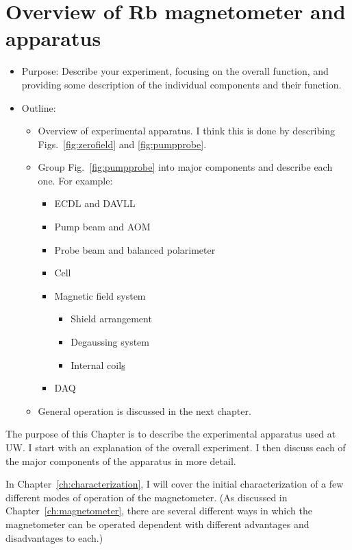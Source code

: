 \chapter{Overview of Rb magnetometer and apparatus}

\begin{itemize}
\item Purpose: Describe your experiment, focusing on the overall
  function, and providing some description of the individual
  components and their function.
\item Outline:
  \begin{itemize}
  \item Overview of experimental apparatus.  I think this is done by
    describing Figs.~\ref{fig:zerofield} and \ref{fig:pumpprobe}.
  \item Group Fig.~\ref{fig:pumpprobe} into major components and
    describe each one.  For example:
    \begin{itemize}
      \item ECDL and DAVLL
      \item Pump beam and AOM
      \item Probe beam and balanced polarimeter
      \item Cell
      \item Magnetic field system
        \begin{itemize}
        \item Shield arrangement
        \item Degaussing system
        \item Internal coil\underline{s}
        \end{itemize}
      \item DAQ
    \end{itemize}
  \item General operation is discussed in the next chapter.
  \end{itemize}
\end{itemize}

The purpose of this Chapter is to describe the experimental apparatus
used at UW.  I start with an explanation of the overall experiment.  I
then discuss each of the major components of the apparatus in more
detail.



In Chapter~\ref{ch:characterization}, I will cover the initial
characterization of a few different modes of operation of the
magnetometer.  (As discussed in Chapter~\ref{ch:magnetometer}, there
are several different ways in which the magnetometer can be operated
dependent with different advantages and disadvantages to each.)

